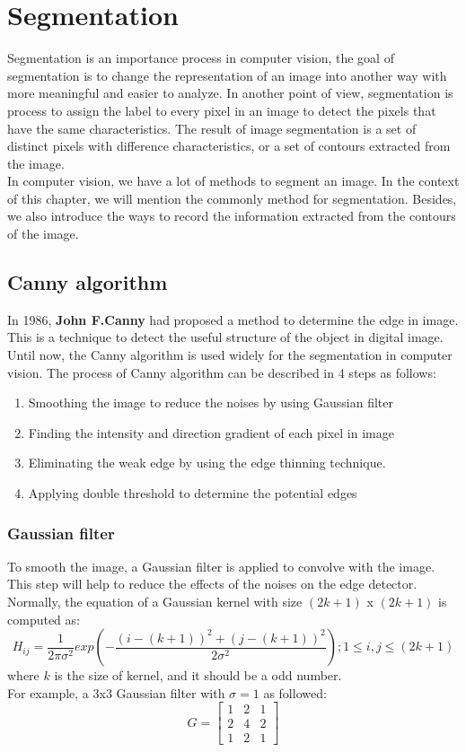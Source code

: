\chapter{Segmentation}
Segmentation is an importance process in computer vision, the goal of segmentation is to change the representation of an image into another way with more meaningful and easier to analyze. In another point of view, segmentation is process to assign the label to every pixel in an image to detect the pixels that have the same characteristics. The result of image segmentation is a set of distinct pixels with difference characteristics, or a set of contours extracted from the image.\\[0.2cm]
In computer vision, we have a lot of methods to segment an image. In the context of this chapter, we will mention the commonly method for segmentation. Besides, we also introduce the ways to record the information extracted from the contours of the image.
\section{Canny algorithm}
In 1986, \textbf{John F.Canny} had proposed a method to determine the edge in image. This is a technique to detect the useful structure of the object in digital image. Until now, the Canny algorithm\cite{canny1986computational} is used widely for the segmentation in computer vision. The process of Canny algorithm can be described in 4 steps as follows:
\begin{enumerate}
	\item Smoothing the image to reduce the noises by using Gaussian filter
	\item Finding the intensity and direction gradient of each pixel in image
	\item Eliminating the weak edge by using the edge thinning technique.
	\item Applying double threshold to determine the potential edges
\end{enumerate}
	\subsection{Gaussian filter}
	To smooth the image, a Gaussian filter is applied to convolve with the image. This step will help to reduce the effects of the noises on the edge detector. Normally, the equation of a Gaussian kernel with size $(2k+1)$ x $(2k + 1)$  is computed as:
	\begin{equation}
	H_{ij}=\frac{1}{2\pi\sigma^2}exp(-\frac{(i-(k+1))^2 + (j-(k+1))^2}{2\sigma^2});1\leq i,j \leq (2k+1)
	\end{equation}
	where $k$ is the size of kernel, and it should be a odd number.\\
	For example, a 3x3 Gaussian filter with $\sigma = 1 $ as followed:
	\begin{equation}
		G = 
		\begin{bmatrix}
		1 & 2 & 1\\
		2 & 4 & 2\\
		1 & 2 & 1		
		\end{bmatrix}
	\end{equation}	
	
